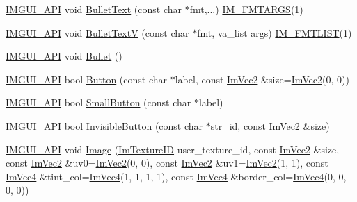 \begin{DoxyCompactItemize}
\item 
\mbox{\hyperlink{imgui_8h_a43829975e84e45d1149597467a14bbf5}{I\+M\+G\+U\+I\+\_\+\+A\+PI}} void \mbox{\hyperlink{namespace_im_gui_af8d34d563b17c683943a0fa7bf5807bc}{Bullet\+Text}} (const char $\ast$fmt,...) \mbox{\hyperlink{imgui_8h_a1251c2f9ddac0873dbad8181bd82c9f1}{I\+M\+\_\+\+F\+M\+T\+A\+R\+GS}}(1)
\item 
\mbox{\hyperlink{imgui_8h_a43829975e84e45d1149597467a14bbf5}{I\+M\+G\+U\+I\+\_\+\+A\+PI}} void \mbox{\hyperlink{namespace_im_gui_af8f4b5e96c745e205974857f9a584583}{Bullet\+TextV}} (const char $\ast$fmt, va\+\_\+list args) \mbox{\hyperlink{imgui_8h_a047693beb7f899f5deab1e20202016b3}{I\+M\+\_\+\+F\+M\+T\+L\+I\+ST}}(1)
\item 
\mbox{\hyperlink{imgui_8h_a43829975e84e45d1149597467a14bbf5}{I\+M\+G\+U\+I\+\_\+\+A\+PI}} void \mbox{\hyperlink{namespace_im_gui_ae2d22212681556d2c2398dfd152f3121}{Bullet}} ()
\item 
\mbox{\hyperlink{imgui_8h_a43829975e84e45d1149597467a14bbf5}{I\+M\+G\+U\+I\+\_\+\+A\+PI}} bool \mbox{\hyperlink{namespace_im_gui_a38094c568ce398db5a3abb9d3ac92030}{Button}} (const char $\ast$label, const \mbox{\hyperlink{struct_im_vec2}{Im\+Vec2}} \&size=\mbox{\hyperlink{struct_im_vec2}{Im\+Vec2}}(0, 0))
\item 
\mbox{\hyperlink{imgui_8h_a43829975e84e45d1149597467a14bbf5}{I\+M\+G\+U\+I\+\_\+\+A\+PI}} bool \mbox{\hyperlink{namespace_im_gui_a5b76ec69758aeb0a00a66f142f7a4fb2}{Small\+Button}} (const char $\ast$label)
\item 
\mbox{\hyperlink{imgui_8h_a43829975e84e45d1149597467a14bbf5}{I\+M\+G\+U\+I\+\_\+\+A\+PI}} bool \mbox{\hyperlink{namespace_im_gui_a22668d440cbbb1f8be07241d9c6d9096}{Invisible\+Button}} (const char $\ast$str\+\_\+id, const \mbox{\hyperlink{struct_im_vec2}{Im\+Vec2}} \&size)
\item 
\mbox{\hyperlink{imgui_8h_a43829975e84e45d1149597467a14bbf5}{I\+M\+G\+U\+I\+\_\+\+A\+PI}} void \mbox{\hyperlink{namespace_im_gui_ad8705ac3b718c1b2e84e7b8c34f90249}{Image}} (\mbox{\hyperlink{imgui_8h_a364f4447ecbc4ca176145ccff9db6286}{Im\+Texture\+ID}} user\+\_\+texture\+\_\+id, const \mbox{\hyperlink{struct_im_vec2}{Im\+Vec2}} \&size, const \mbox{\hyperlink{struct_im_vec2}{Im\+Vec2}} \&uv0=\mbox{\hyperlink{struct_im_vec2}{Im\+Vec2}}(0, 0), const \mbox{\hyperlink{struct_im_vec2}{Im\+Vec2}} \&uv1=\mbox{\hyperlink{struct_im_vec2}{Im\+Vec2}}(1, 1), const \mbox{\hyperlink{struct_im_vec4}{Im\+Vec4}} \&tint\+\_\+col=\mbox{\hyperlink{struct_im_vec4}{Im\+Vec4}}(1, 1, 1, 1), const \mbox{\hyperlink{struct_im_vec4}{Im\+Vec4}} \&border\+\_\+col=\mbox{\hyperlink{struct_im_vec4}{Im\+Vec4}}(0, 0, 0, 0))

\end{DoxyCompactItemize}
